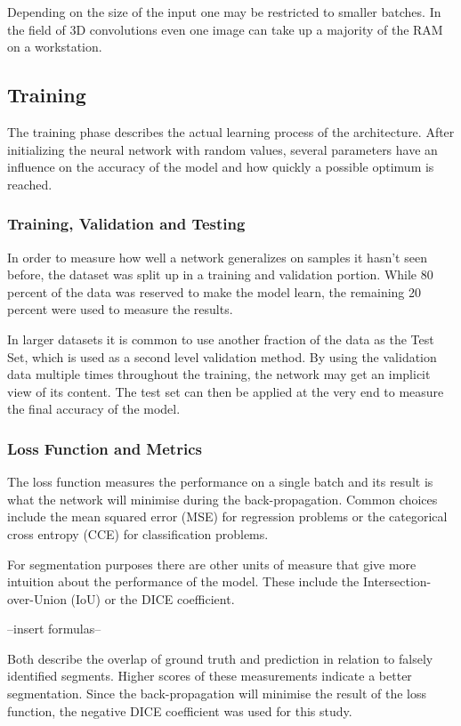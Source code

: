 Depending on the size of the input one may be restricted to smaller batches. In the field of 3D convolutions even one image can take up a majority of the RAM on a workstation.

\subsection{Training}

The training phase describes the actual learning process of the architecture. After initializing the neural network with random values, several parameters have an influence on the accuracy of the model and how quickly a possible optimum is reached.

\subsubsection{Training, Validation and Testing}

In order to measure how well a network generalizes on samples it hasn't seen before, the dataset was split up in a training and validation portion. While 80 percent of the data was reserved to make the model learn, the remaining 20 percent were used to measure the results.

In larger datasets it is common to use another fraction of the data as the Test Set, which is used as a second level validation method. By using the validation data multiple times throughout the training, the network may get an implicit view of its content. The test set can then be applied at the very end to measure the final accuracy of the model.

\subsubsection{Loss Function and Metrics}

The loss function measures the performance on a single batch and its result is what the network will minimise during the back-propagation. Common choices include the mean squared error (MSE) for regression problems or the categorical cross entropy (CCE) for classification problems. 

For segmentation purposes there are other units of measure that give more intuition about the performance of the model. These include the Intersection-over-Union (IoU) or the DICE coefficient. 

--insert formulas--

Both describe the overlap of ground truth and prediction in relation to falsely identified segments. Higher scores of these measurements indicate a better segmentation. Since the back-propagation will minimise the result of the loss function, the negative DICE coefficient was used for this study.

